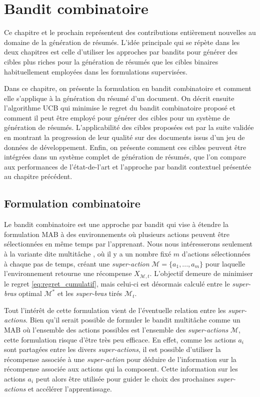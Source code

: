 \chapter{Bandit combinatoire}
\label{chap:bandit_combi}                   %

Ce chapitre et le prochain représentent des contributions entièrement
nouvelles au domaine de la génération de résumés.
L'idée principale qui se répète dans les deux chapitres est celle d'utiliser
les approches par bandits pour générer des cibles plus riches
pour la génération de résumés que les cibles binaires habituellement
employées dans les formulations supervisées.

Dans ce chapitre, on présente la formulation en bandit combinatoire et
comment elle s'applique à la génération du résumé d'un document.
On décrit ensuite l'algorithme UCB \citep{ucb} qui minimise le regret du bandit combinatoire
proposé et comment il peut être employé pour générer des cibles pour un système
de génération de résumés.
L'applicabilité des cibles proposées est par la suite validée en montrant la
progression de leur qualité sur des documents issus d'un jeu de données de développement.
Enfin, on présente comment ces cibles peuvent être intégrées dans un système complet de
génération de résumés, que l'on compare aux performances de l'état-de-l'art et l'approche par bandit
contextuel présentée au chapitre précédent.

\section{Formulation combinatoire}
\label{section:formulation_combi}

Le bandit combinatoire est une approche par bandit qui vise à étendre
la formulation MAB à des environnements où plusieurs actions peuvent être sélectionnées
en même temps par l'apprenant.
Nous nous intéresserons seulement à la variante dite multitâche \citep{banditalgs}, où
il y a un nombre fixé $m$ d'actions sélectionnées à
chaque pas de temps, créant une \textit{super-action} $\mathcal{M} = \{a_1, ..., a_m\}$
pour laquelle l'environnement retourne une récompense $X_{\mathcal{M}, t}$.
L'objectif demeure de minimiser le regret \eqref{eq:regret_cumulatif}, mais celui-ci est désormais calculé entre
le \textit{super-bras} optimal $\mathcal{M}^*$ et les \textit{super-bras} tirés
$\mathcal{M}_t$.

Tout l'intérêt de cette formulation vient de l'éventuelle relation entre les \textit{super-actions}.
Bien qu'il serait possible de formuler le bandit multitâche comme un MAB où l'ensemble des
actions possibles est l'ensemble des \textit{super-actions} $\mathcal{M}$, cette formulation
risque d'être très peu efficace.
En effet, comme les actions $a_i$ sont partagées entre les divers \textit{super-actions},
il est possible d'utiliser la récompense associée à une \textit{super-action} pour
déduire de l'information sur la récompense associée aux actions qui la composent.
Cette information sur les actions $a_i$ peut alors être utilisée pour guider le choix des
prochaines \textit{super-actions} et accélérer l'apprentissage.

